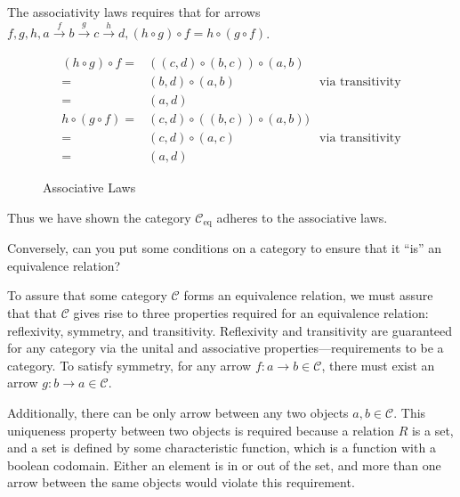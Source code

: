\begin{proofitem}
\item The associativity laws requires that for arrows $f, g, h,
        a \overset{f}{\rightarrow} b \overset{g}{\rightarrow} c
        \overset{h}{\rightarrow} d, (h\circ g)\circ f=h\circ (g \circ f)$.
\begin{figure}[H]
\begin{align*}
    (h\circ g)\circ f=&((c, d)\circ (b, c))\circ (a, b)\\
    =&(b, d)\circ (a, b)&\text{via transitivity}\\
    =&(a, d)\\
    h\circ (g\circ f)=&(c, d)\circ ((b, c))\circ (a, b))\\
    =&(c, d)\circ (a, c)&\text{via transitivity}\\
    =&(a, d)
\end{align*}
\caption{Associative Laws}
\end{figure}
\item Thus we have shown the category $\mathcal{C}_{\text{eq}}$ adheres to the
    associative laws.
\item Conversely, can you put some conditions on a category to ensure that it
    “is” an equivalence relation?
\item To assure that some category $\mathcal{C}$ forms an equivalence relation,
    we must assure that that $\mathcal{C}$ gives rise to three properties
    required for an equivalence relation: reflexivity, symmetry, and
    transitivity. Reflexivity and transitivity are guaranteed for any category
    via the unital and associative properties---requirements to be a category. To
    satisfy symmetry, for any arrow $f:a\rightarrow b\in \mathcal{C}$, there
    must exist an arrow $g:b\rightarrow a\in \mathcal{C}$.

    Additionally, there can be only arrow between any two objects $a, b \in
    \mathcal{C}$. This uniqueness property between two objects is required
    because a relation $R$ is a set, and a set is defined by some characteristic
    function, which is a function with a boolean codomain. Either an element is
    in or out of the set, and more than one arrow between the same objects would
    violate this requirement.
\end{proofitem}

